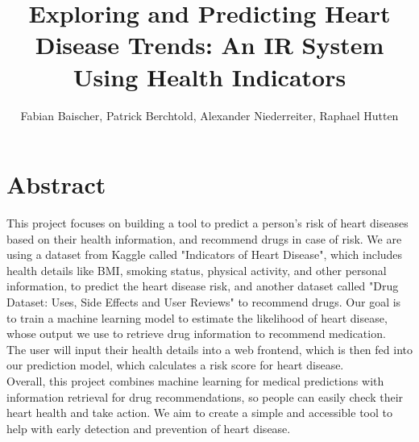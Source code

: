 \documentclass{article}
\title{Exploring and Predicting Heart Disease Trends: An IR System Using  Health Indicators}
\author{Fabian Baischer, Patrick Berchtold, Alexander Niederreiter, Raphael Hutten}
\begin{document}
\maketitle


\section{Abstract}

This project focuses on building a tool to predict a person’s risk of heart diseases based on their health information, and recommend drugs in case of risk.
We are using a dataset from Kaggle called "Indicators of Heart Disease",
which includes health details like BMI, smoking status, physical activity, and other personal information, to predict the heart disease risk,
and another dataset called "Drug Dataset: Uses, Side Effects and User Reviews" to recommend drugs.
Our goal is to train a machine learning model to estimate the likelihood of heart disease,
whose output we use to retrieve drug information to recommend medication.\\
The user will input their health details into a web frontend, which is then fed into our prediction model, which calculates a risk score for heart disease.\\
Overall, this project combines machine learning for medical predictions with information retrieval for drug recommendations,
so people can easily check their heart health and take action.
We aim to create a simple and accessible tool to help with early detection and prevention of heart disease.
\end{document}
